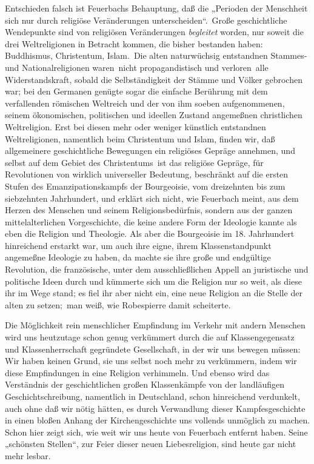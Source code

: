 Entschieden falsch ist Feuerbachs Behauptung, daß die „Perioden
der Menschheit sich nur durch religiöse Veränderungen unterscheiden``. \textbar{}\,Große geschichtliche Wendepunkte sind von religiösen
Veränderungen \emph{begleitet} worden, nur soweit die drei
Weltreligionen in Betracht kommen, die bisher bestanden haben:
Buddhismus, Christentum, Islam.\,\textbar{} Die alten naturwüchsig entstandnen
Stammes- und Nationalreligionen waren \textbar{}\,nicht propagandistisch und
verloren\,\textbar{} alle Widerstandskraft, sobald die Selbständigkeit der Stämme
und Völker gebrochen war; bei den Germanen genügte sogar die einfache
Berührung mit dem verfallenden römischen Weltreich und der von ihm
soeben aufgenommenen, seinem ökonomischen, politischen und ideellen
Zustand angemeßnen christlichen Weltreligion. Erst bei diesen mehr oder
weniger künstlich entstandnen Weltreligionen, namentlich beim
Christentum und Islam, finden wir, daß allgemeinere geschichtliche
Bewegungen ein religiöses Gepräge annehmen, und \textbar{}\,selbst auf dem Gebiet
des Christentums\,\textbar{} ist das religiöse Gepräge, für Revolutionen von
wirklich universeller Bedeutung, beschränkt auf die ersten Stufen des
Emanzipationskampfs der Bourgeoisie, vom dreizehnten bis zum siebzehnten
Jahrhundert, und erklärt sich nicht, wie Feuerbach meint, aus dem Herzen
des Menschen und seinem Religionsbedürfnis, sondern aus der ganzen
mittelalterlichen Vorgeschichte, die keine andere Form der Ideologie
kannte als eben die Religion und Theologie. Als aber die Bourgeoisie im
18. Jahrhundert hinreichend erstarkt war, um auch ihre eigne, ihrem
Klassenstandpunkt angemeßne Ideologie zu haben, da machte sie ihre große
und endgültige Revolution, die französische, unter dem ausschließlichen
Appell an juristische und politische Ideen durch und kümmerte sich um
die Religion nur so weit, als diese ihr im Wege stand; es fiel ihr aber
nicht ein, eine neue Religion an die Stelle der alten zu setzen; \textbar{}\,man
weiß, wie Robespierre damit scheiterte.\,\textbar{}

Die Möglichkeit rein menschlicher Empfindung im Verkehr mit
andern Menschen wird uns heutzutage schon genug verkümmert durch die auf
Klassengegensatz und Klassenherrschaft gegründete Gesellschaft, in der
wir uns bewegen müssen: Wir haben keinen Grund, sie uns selbst noch mehr
zu verkümmern, indem wir diese Empfindungen in eine Religion verhimmeln.
Und ebenso wird das Verständnis der geschichtlichen großen Klassenkämpfe
von der landläufigen Geschichtschreibung, namentlich in Deutschland,
schon hinreichend verdunkelt, auch ohne daß wir nötig hätten, es durch
Verwandlung dieser Kampfesgeschichte in einen bloßen Anhang der
Kirchengeschichte uns vollends unmöglich zu machen. Schon hier zeigt
sich, wie weit wir uns heute von Feuerbach entfernt haben. Seine
„schönsten Stellen``, zur Feier dieser neuen Liebesreligion, sind heute
gar nicht mehr lesbar.

